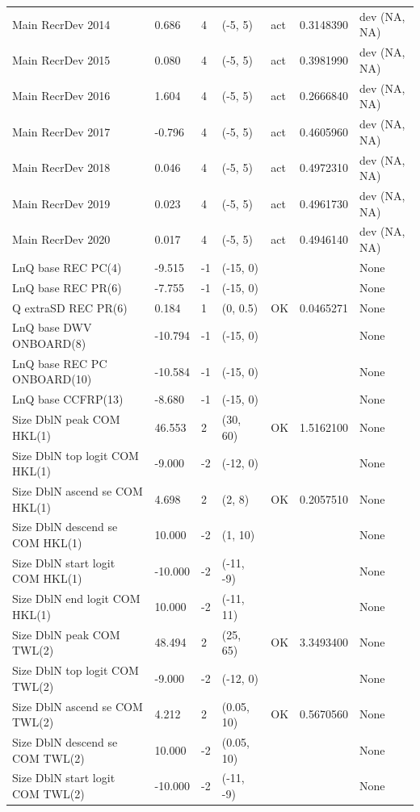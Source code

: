 \documentclass[
  english,
  a4paper,
]{article}
\begin{document}
\begin{landscape}
\begin{longtable}[t]{>{\raggedright\arraybackslash}p{8.5cm}lllll>{\raggedright\arraybackslash}p{4cm}}
Main RecrDev 2014 & 0.686 & 4 & (-5, 5) & act & 0.3148390 & dev (NA, NA)\\
Main RecrDev 2015 & 0.080 & 4 & (-5, 5) & act & 0.3981990 & dev (NA, NA)\\
Main RecrDev 2016 & 1.604 & 4 & (-5, 5) & act & 0.2666840 & dev (NA, NA)\\
Main RecrDev 2017 & -0.796 & 4 & (-5, 5) & act & 0.4605960 & dev (NA, NA)\\
Main RecrDev 2018 & 0.046 & 4 & (-5, 5) & act & 0.4972310 & dev (NA, NA)\\
Main RecrDev 2019 & 0.023 & 4 & (-5, 5) & act & 0.4961730 & dev (NA, NA)\\
Main RecrDev 2020 & 0.017 & 4 & (-5, 5) & act & 0.4946140 & dev (NA, NA)\\
LnQ base REC PC(4) & -9.515 & -1 & (-15, 0) &  &  & None\\
LnQ base REC PR(6) & -7.755 & -1 & (-15, 0) &  &  & None\\
Q extraSD REC PR(6) & 0.184 & 1 & (0, 0.5) & OK & 0.0465271 & None\\
LnQ base DWV ONBOARD(8) & -10.794 & -1 & (-15, 0) &  &  & None\\
LnQ base REC PC ONBOARD(10) & -10.584 & -1 & (-15, 0) &  &  & None\\
LnQ base CCFRP(13) & -8.680 & -1 & (-15, 0) &  &  & None\\
Size DblN peak COM HKL(1) & 46.553 & 2 & (30, 60) & OK & 1.5162100 & None\\
Size DblN top logit COM HKL(1) & -9.000 & -2 & (-12, 0) &  &  & None\\
Size DblN ascend se COM HKL(1) & 4.698 & 2 & (2, 8) & OK & 0.2057510 & None\\
Size DblN descend se COM HKL(1) & 10.000 & -2 & (1, 10) &  &  & None\\
Size DblN start logit COM HKL(1) & -10.000 & -2 & (-11, -9) &  &  & None\\
Size DblN end logit COM HKL(1) & 10.000 & -2 & (-11, 11) &  &  & None\\
Size DblN peak COM TWL(2) & 48.494 & 2 & (25, 65) & OK & 3.3493400 & None\\
Size DblN top logit COM TWL(2) & -9.000 & -2 & (-12, 0) &  &  & None\\
Size DblN ascend se COM TWL(2) & 4.212 & 2 & (0.05, 10) & OK & 0.5670560 & None\\
Size DblN descend se COM TWL(2) & 10.000 & -2 & (0.05, 10) &  &  & None\\
Size DblN start logit COM TWL(2) & -10.000 & -2 & (-11, -9) &  &  & None\\

\end{longtable}
\end{landscape}
\end{document}
